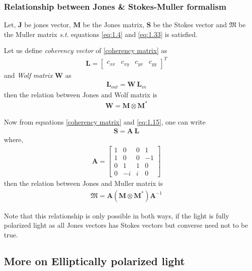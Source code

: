 \documentclass[11pt,a4paper]{article}
\numberwithin{equation}{section}
\begin{document}
\subsubsection{Relationship between Jones \& Stokes-Muller formalism}
Let, $\boldsymbol{J}$ be jones vector, $\boldsymbol{M}$ be the Jones matrix, $\boldsymbol{S}$ be the Stokes vector and $\boldsymbol{\mathfrak{M}}$ be the Muller matrix \textit{s.t.} equations \ref{eq:1.4} and \ref{eq:1.33} is satisfied.

Let us define \textit{coherency vector} of \ref{coherency matrix} as 
\begin{align}
	\boldsymbol{L}=
	\begin{bmatrix}
		c_{xx} & c_{xy} & c_{yx} & c_{yy}
	\end{bmatrix}^T
\end{align}
and \textit{Wolf matrix} $\boldsymbol{W}$ as 
\begin{align}
	\boldsymbol{L}_{out}=\boldsymbol{W}\:\boldsymbol{L}_{in}
\end{align}
then the relation between Jones and Wolf matrix is
\begin{align}
	\boldsymbol{W}=\boldsymbol{M}\otimes\boldsymbol{M}^\ast
\end{align}


Now from equations \ref{coherency matrix} and \ref{eq:1.15}, one can write
\begin{align}
	\boldsymbol{S}=\boldsymbol{A}\:\boldsymbol{L}
\end{align}
where,
\begin{align}
	\boldsymbol{A}=
	\begin{bmatrix}
		1 & 0 & 0 & 1 \\
		1 & 0 & 0 & -1 \\
		0 & 1 & 1 & 0 \\
		0 & -i & i & 0
	\end{bmatrix}
\end{align}
then the relation between Jones and Muller matrix is
\begin{align}
	\boldsymbol{\mathfrak{M}}=\boldsymbol{A} \left(\boldsymbol{M}\otimes\boldsymbol{M}^\ast\right) \boldsymbol{A}^{-1}
\end{align} 

Note that this relationship is only possible in both ways, if the light is fully polarized light as all Jones vectors has Stokes vectors but converse need not to be true.

\subsection{More on Elliptically polarized light}
\end{document}
